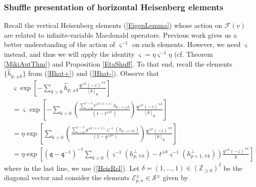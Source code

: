 \documentclass{amsart}
\newcommand{\Z}{\mathbb{Z}}
\newcommand{\qqq}{\mathfrak{q}}
\newcommand{\ddd}{\mathfrak{d}}
\theoremstyle{remark}
\numberwithin{thm}{section}
\numberwithin{equation}{section}
\begin{document}
\subsubsection{Shuffle presentation of horizontal Heisenberg elements}
Recall the vertical Heisenberg elements (\ref{EigenLemma}) whose action on $\mathcal{F}(v)$ are related to infinite-variable Macdonald operators.
Previous work \cite{Wen} gives us a better understanding of the action of $\varsigma^{-1}$ on such elements.
However, we need $\varsigma$ instead, and thus we will apply the identity $\varsigma=\eta\varsigma^{-1}\eta$ (cf. Theorem \ref{MikiAutThm}) and Proposition \ref{EtaShuff}.
To that end, recall the elements $\{\hat{h}_{p,\pm k}\}$ from (\ref{Hhat+}) and (\ref{Hhat-}).
Observe that
\begin{equation}
\begin{aligned}
&\varsigma\exp\left[-\sum_{k>0}\hat{h}_{p,\pm k}\frac{\qqq^{\pm k} (-z)^{\mp k}}{[ k]_{\qqq}} \right] \\
&=\varsigma\exp\left[-\sum_{k>0}\left(\frac{\sum_{i=0}^{r-1}t^{\pm k(i+1)}h_{p-i,\pm k}}{(1-t^{\pm kr})}\right)\frac{\qqq^{\pm k} (-z)^{\mp k}}{[ k]_{\qqq}} \right] \\
&=\eta\exp\left[\sum_{k>0}\left(\frac{\sum_{i=0}^{r-1}q^{\pm k(i+1)}\varsigma^{-1}(h_{p-i,\mp k})}{(1-q^{\pm kr})}\right)\frac{\qqq^{\pm k} (-z)^{\mp k}}{[ k]_{\qqq}} \right]\\
&= \eta\exp\left[(\qqq-\qqq^{-1})^{-1}\sum_{k>0}\left(\varsigma^{-1}(h_{p,\mp k}^\perp)-t^{\pm k}\varsigma^{-1}(h_{p+1,\mp k}^\perp)\right)\frac{q^{\pm k} (-z)^{\mp k}}{k} \right]
\end{aligned}
\label{MikiPerp}
\end{equation}
where in the last line, we use (\ref{HeisRel}).
Let $\delta=(1,\ldots, 1)\in\left( \Z_{\ge 0} \right)^I$ be the diagonal vector and consider the elements $\mathcal{E}_{p,n}^\pm\in\mathcal{S}^\pm$ given by
\end{document}
